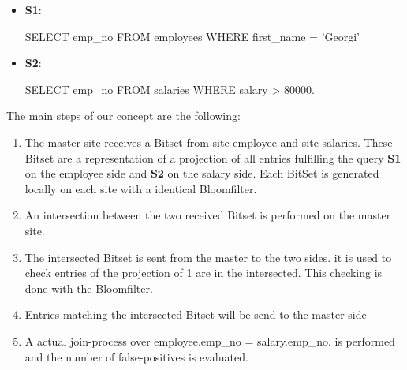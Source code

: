 \documentclass[12]{scrartcl}
\begin{document}
\begin{itemize}
	\item[]  \textbf{S1}: \begin{verb}
		SELECT emp_no FROM employees WHERE first_name = 'Georgi'
	\end{verb}
	\item[]  \textbf{S2}: \begin{verb}
		SELECT emp_no FROM salaries WHERE salary > 80000.
	\end{verb}
\end{itemize}


The main steps of our concept are the following:
\begin{enumerate}
	\item The master site receives a Bitset from site employee and site salaries. These Bitset are a representation of a projection of all entries fulfilling the query \textbf{S1} on the employee side and \textbf{S2} on the salary side. Each BitSet is generated locally on each site with a identical Bloomfilter.
	\item An intersection between the two received Bitset is performed on the master site.
	\item The intersected Bitset is sent from the master to the two sides. it is used to check entries of the projection of 1 are in the intersected. This checking is done with the Bloomfilter.
	\item Entries matching the intersected Bitset will be send to the master side
	\item A actual join-process over employee.emp\_no = salary.emp\_no. is performed and the number of false-positives is evaluated.
	\end{enumerate}
\end{document}

